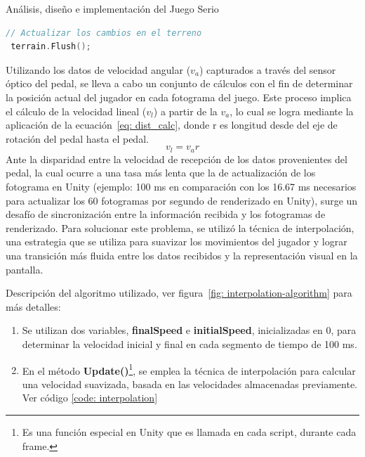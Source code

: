 \begin{thesischapter}{2} {Análisis, diseño e implementación del Juego Serio}
\begin{center}
\begin{minipage}{0.8\textwidth}
\begin{lstlisting}[language=c, caption={Posicionar árboles},label={hola}]
 // Actualizar los cambios en el terreno
 terrain.Flush();
\end{lstlisting}
\end{minipage}  
\end{center}


    \vspace{10pt}
    Utilizando los datos de velocidad angular ($v_{a}$) capturados a través del sensor óptico del pedal, se lleva a 
    cabo un conjunto de cálculos con el fin de determinar la posición actual del jugador en cada fotograma 
    del juego. Este proceso implica el cálculo de la velocidad lineal ($v_{l}$) a partir de la $v_{a}$, lo 
    cual se logra mediante la aplicación de la ecuación~\ref{eq: dist_calc}, donde r es longitud desde del eje de rotación del pedal hasta el pedal.
    \begin{equation}
        v_{l} = v_{a}r
        \label{eq: dist_calc}        
    \end{equation}
    Ante la disparidad entre la velocidad de recepción de los datos provenientes del pedal, la cual ocurre a una tasa más lenta que la de actualización de los fotograma en Unity
    (ejemplo: 100 ms en comparación con los 16.67 ms necesarios para actualizar los 60 fotogramas por segundo de renderizado en Unity), surge un desafío de sincronización entre la información 
    recibida y los fotogramas de renderizado. Para solucionar este problema, se utilizó la técnica de interpolación, una estrategia que se utiliza para suavizar los movimientos 
    del jugador y lograr una transición más fluida entre los datos recibidos y la representación visual en la pantalla.

    \vspace{10pt}
    Descripción del algoritmo utilizado, ver figura~\ref{fig: interpolation-algorithm} para más detalles:
    \begin{enumerate}
        \item Se utilizan dos variables, \textbf{finalSpeed} e \textbf{initialSpeed}, inicializadas en 0, para determinar la velocidad inicial y final en cada segmento de tiempo de 100 ms.
        \item En el método \textbf{Update()}\footnote{Es una función especial en Unity que es llamada en cada script, durante cada frame.}, se emplea la técnica de interpolación para calcular 
        una velocidad suavizada, basada en las velocidades almacenadas previamente. Ver código \ref{code: interpolation}
    \end{enumerate} 


\end{thesischapter}
